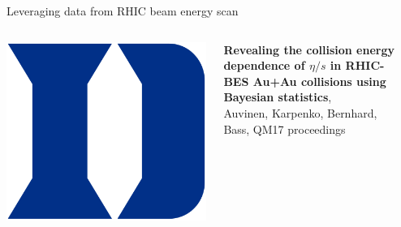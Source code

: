 \documentclass{beamer}
\begin{document}
\begin{frame}{Leveraging data from RHIC beam energy scan}
\begin{columns}[T]
\begin{column}{0.05\textwidth}
      \includegraphics[width=\columnwidth]{duke}
    \end{column}
    \begin{column}{0.9\textwidth}
      \scriptsize {}
      \textbf{Revealing the collision energy dependence of $\eta/s$ in RHIC-BES Au+Au
      collisions using Bayesian statistics},\\
      Auvinen, Karpenko, Bernhard, Bass, QM17 proceedings
    \end{column}
    \begin{column}{0.025\textwidth}
    \end{column}
  \end{columns}
\end{frame}
\end{document}
